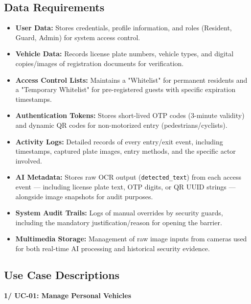 \documentclass[a4paper]{article}
\begin{document}
\subsection{Data Requirements}

\begin{itemize}
    \item \textbf{User Data:} Stores credentials, profile information, and roles (Resident, Guard, Admin) for system access control.
    
    \item \textbf{Vehicle Data:} Records license plate numbers, vehicle types, and digital copies/images of registration documents for verification.
    
    \item \textbf{Access Control Lists:} Maintains a "Whitelist" for permanent residents and a "Temporary Whitelist" for pre-registered guests with specific expiration timestamps.
    
    \item \textbf{Authentication Tokens:} Stores short-lived OTP codes (3-minute validity) and dynamic QR codes for non-motorized entry (pedestrians/cyclists).
    
    \item \textbf{Activity Logs:} Detailed records of every entry/exit event, including timestamps, captured plate images, entry methods, and the specific actor involved.
    
    \item \textbf{AI Metadata:} Stores raw OCR output (\texttt{detected\_text}) from each access event — including license plate text, OTP digits, or QR UUID strings — alongside image snapshots for audit purposes.
    
    \item \textbf{System Audit Trails:} Logs of manual overrides by security guards, including the mandatory justification/reason for opening the barrier.
    
    \item \textbf{Multimedia Storage:} Management of raw image inputs from cameras used for both real-time AI processing and historical security evidence.
\end{itemize}

\newpage
\subsection{Use Case Descriptions}

\noindent \textbf{1/ UC-01: Manage Personal Vehicles}
\end{document}
